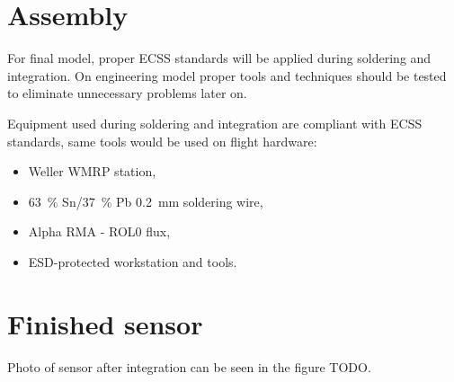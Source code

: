 \section{Assembly}
    For final model, proper ECSS standards will be applied during soldering and integration. On engineering model proper tools and techniques should be tested to eliminate unnecessary problems later on.

    Equipment used during soldering and integration are compliant with ECSS standards, same tools would be used on flight hardware:
    \begin{itemize}
        \item Weller WMRP station,
        \item \SI{63}{\percent} Sn/\SI{37}{\percent} Pb \SI{0.2}{\milli\meter} soldering wire,
        \item Alpha RMA - ROL0 flux,
        \item ESD-protected workstation and tools.
    \end{itemize}

\section{Finished sensor}
    Photo of sensor after integration can be seen in the figure TODO.
